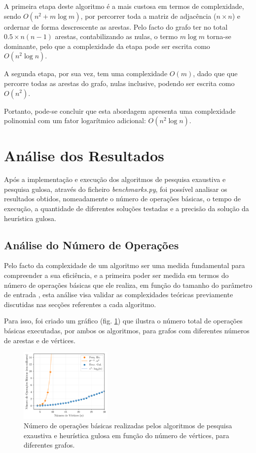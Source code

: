 \documentclass[mirror, portugues]{revdetua}
\begin{document}
A primeira etapa deste algoritmo é a mais custosa em termos de complexidade, sendo $O(n^2 + m \log m)$, por percorrer toda a matriz de adjacência ($n \times n$) e ordernar de forma descrescente as arestas. Pelo facto do grafo ter no total $0.5 \times n(n-1)$ arestas, contabilizando as nulas, o termo $m \log m$ torna-se dominante, pelo que a complexidade da etapa pode ser escrita como $O(n^2 \log n)$.

A segunda etapa, por sua vez, tem uma complexidade $O(m)$, dado que que percorre todas as arestas do grafo, nulas inclusive, podendo ser escrita como $O(n^2)$.

Portanto, pode-se concluir que esta abordagem apresenta uma complexidade polinomial com um fator logarítmico adicional: $O(n^2 \log n)$.

\section{Análise dos Resultados}

Após a implementação e execução dos algoritmos de pesquisa exaustiva e pesquisa gulosa, através do ficheiro \textit{benchmarks.py}, foi possível analisar os resultados obtidos, nomeadamente o número de operações básicas, o tempo de execução, a quantidade de diferentes soluções testadas e a precisão da solução da heurística gulosa.

\subsection{Análise do Número de Operações}

Pelo facto da complexidade de um algoritmo ser uma medida fundamental para compreender a sua eficiência, e a primeira poder ser medida em termos do número de operações básicas que ele realiza, em função do tamanho do parâmetro de entrada \cite{BS22}, esta análise visa validar as complexidades teóricas previamente discutidas nas secções referentes a cada algoritmo.

Para isso, foi criado um gráfico (fig. \ref{fig:numeroops}) que ilustra o número total de operações básicas executadas, por ambos os algoritmos, para grafos com diferentes números de arestas e de vértices.

\begin{figure}[h]
    \centering
    \includegraphics[width=0.4\textwidth]{../assets/numberOPS.png}
    \caption{Número de operações básicas realizadas pelos algoritmos de pesquisa exaustiva e heurística gulosa em função do número de vértices, para diferentes grafos.}
    \label{fig:numeroops}
\end{figure}
\end{document}
